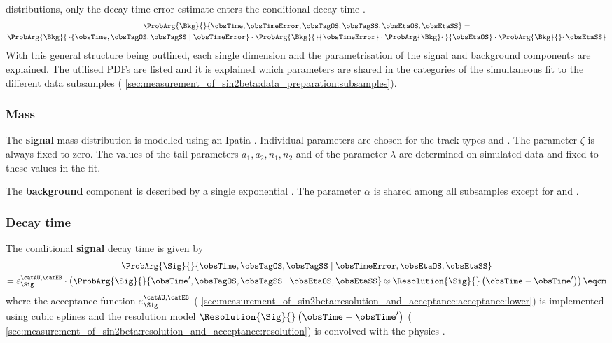 distributions, only the decay time error estimate enters the conditional decay
time \PDF.
%
\begin{multline}
  \ProbArg{\Bkg}{}{\obsTime, \obsTimeError, \obsTagOS, \obsTagSS, \obsEtaOS, \obsEtaSS} = \\ 
  \ProbArg{\Bkg}{}{\obsTime, \obsTagOS, \obsTagSS \mid \obsTimeError} \cdot
  \ProbArg{\Bkg}{}{\obsTimeError} \cdot
  \ProbArg{\Bkg}{}{\obsEtaOS} \cdot
  \ProbArg{\Bkg}{}{\obsEtaSS}
\end{multline}
%
With this general structure being outlined, each single dimension and the
parametrisation of the signal and background components are explained. The
utilised \acp{PDF} are listed and it is explained which parameters are shared in
the categories of the simultaneous fit to the different data subsamples (\cf
\cref{sec:measurement_of_sin2beta:data_preparation:subsamples}).

\subsubsection{Mass}
\label{sec:measurement_of_sin2beta:likelihood_fit:model:mass}

The \textbf{signal} mass distribution is modelled using an Ipatia \PDF.
Individual parameters are chosen for the track types \catDD and \catLL. The
parameter $\zeta$ is always fixed to zero. The values of the tail parameters
$a_1, a_2, n_1, n_2$ and of the parameter $\lambda$ are determined on simulated
data and fixed to these values in the fit.

The \textbf{background} component is described by a single exponential \PDF. The
parameter $\alpha$ is shared among all subsamples except for \catDD and \catLL.

\subsubsection{Decay time}
\label{sec:measurement_of_sin2beta:likelihood_fit:model:decay_time}

The conditional \textbf{signal} decay time \PDF is given by
%
\begin{multline}
    \ProbArg{\Sig}{}{\obsTime, \obsTagOS, \obsTagSS \mid \obsTimeError, \obsEtaOS, \obsEtaSS} \\ 
  = \varepsilon_{\Sig}^{\text{\catAU,\catEB}} \cdot \left(\ProbArg{\Sig}{}{\obsTime^\prime, \obsTagOS, \obsTagSS \mid \obsEtaOS, \obsEtaSS} \otimes \Resolution{\Sig}{}\left(\obsTime-\obsTime^\prime\right)\right)\eqcm
\end{multline}
%
where the acceptance function $\varepsilon_{\Sig}^{\text{\catAU,\catEB}}$ (\cf
\cref{sec:measurement_of_sin2beta:resolution_and_acceptance:acceptance:lower})
is implemented using cubic splines and the resolution model
$\Resolution{\Sig}{}\left(\obsTime-\obsTime^\prime\right)$ (\cf
\cref{sec:measurement_of_sin2beta:resolution_and_acceptance:resolution}) is
convolved with the \B physics \PDF.

